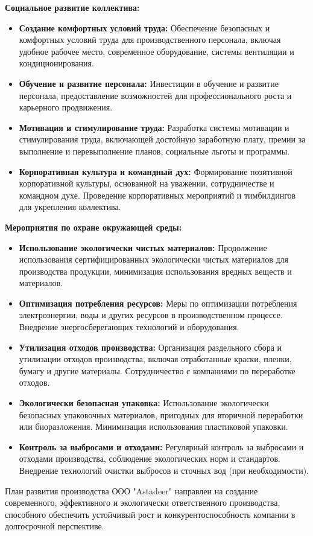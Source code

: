 \textbf{Социальное развитие коллектива:}

\begin{itemize}
    \item \textbf{Создание комфортных условий труда:}  Обеспечение безопасных и комфортных условий труда для производственного персонала, включая удобное рабочее место, современное оборудование, системы вентиляции и кондиционирования.
    \item \textbf{Обучение и развитие персонала:}  Инвестиции в обучение и развитие персонала, предоставление возможностей для профессионального роста и карьерного продвижения.
    \item \textbf{Мотивация и стимулирование труда:}  Разработка системы мотивации и стимулирования труда, включающей достойную заработную плату, премии за выполнение и перевыполнение планов, социальные льготы и программы.
    \item \textbf{Корпоративная культура и командный дух:}  Формирование позитивной корпоративной культуры, основанной на уважении, сотрудничестве и командном духе.  Проведение корпоративных мероприятий и тимбилдингов для укрепления коллектива.
\end{itemize}

\vspace{0.3cm}

\textbf{Мероприятия по охране окружающей среды:}

\begin{itemize}
    \item \textbf{Использование экологически чистых материалов:}  Продолжение использования сертифицированных экологически чистых материалов для производства продукции, минимизация использования вредных веществ и материалов.
    \item \textbf{Оптимизация потребления ресурсов:}  Меры по оптимизации потребления электроэнергии, воды и других ресурсов в производственном процессе.  Внедрение энергосберегающих технологий и оборудования.
    \item \textbf{Утилизация отходов производства:}  Организация раздельного сбора и утилизации отходов производства, включая отработанные краски, пленки, бумагу и другие материалы.  Сотрудничество с компаниями по переработке отходов.
    \item \textbf{Экологически безопасная упаковка:}  Использование экологически безопасных упаковочных материалов, пригодных для вторичной переработки или биоразложения.  Минимизация использования пластиковой упаковки.
    \item \textbf{Контроль за выбросами и отходами:}  Регулярный контроль за выбросами и отходами производства, соблюдение экологических норм и стандартов.  Внедрение технологий очистки выбросов и сточных вод (при необходимости).
\end{itemize}

План развития производства ООО "Astadeer" направлен на создание современного, эффективного и экологически ответственного производства, способного обеспечить устойчивый рост и конкурентоспособность компании в долгосрочной перспективе.
